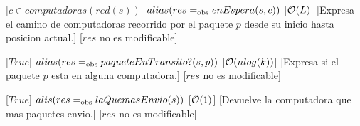 \begin{Interfaz}
  
  [$ c \in computadoras(red(s)) $]  
  {$alias(res =_{\mathrm{obs}} enEspera(s, c))$}
  [$\mathcal{O}(L)$]
  [Expresa el camino de computadoras recorrido por el paquete $p$ desde su inicio hasta posicion actual.]
	[$res$ no es modificable]

  [$ True $]  
  {$alias(res =_{\mathrm{obs}} paqueteEnTransito?(s, p))$}
  [$\mathcal{O}(nlog(k))$]
  [Expresa si el paquete $p$ esta en alguna computadora.]
  [$res$ no es modificable]
  
  [$ True $]
  {$alis(res =_{\mathrm{obs}} laQuemasEnvio(s))$}
  [$\mathcal{O}(1)$]
  [Devuelve la computadora que mas paquetes envio.]
  [$res$ no es modificable]

\end{Interfaz}

